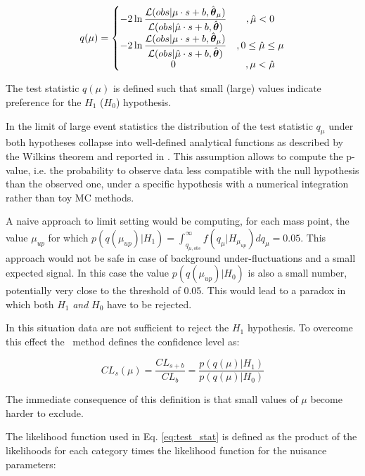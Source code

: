 \begin{equation}
q(\mu) = \left\{\begin{matrix}
-2 \operatorname{ln} \dfrac{\mathcal{L}(obs | \mu \cdot s + b, \hat{\boldsymbol\theta}_\mu)}{\mathcal{L}(obs | \hat{\mu} \cdot s + b, \hat{\boldsymbol\theta})} & , \hat{\mu} < 0\\ 
-2 \operatorname{ln} \dfrac{\mathcal{L}(obs | \mu \cdot s + b, \hat{\boldsymbol\theta}_\mu)}{\mathcal{L}(obs | \hat{\mu} \cdot s + b, \hat{\boldsymbol\theta})} & ,0 \leq \hat{\mu} \leq \mu \\ 
0 & , \mu < \hat{\mu}
\end{matrix}\right.
\label{eq:test_stat}
\end{equation}

The test statistic $q(\mu)$ is defined such that small (large) values indicate preference for the $H_1$ ($H_0$) hypothesis.

In the limit of large event statistics the distribution of the test statistic $q_\mu$ under both hypotheses collapse into well-defined analytical functions as described by the Wilkins theorem and reported in \cite{Cowan:2010js, higgscombo}. This assumption allows to compute the p-value, i.e. the probability to observe data less compatible with the null hypothesis than the observed one, under a specific hypothesis with a numerical integration rather than toy MC methods.

A naive approach to limit setting would be computing, for each mass point, the value $\mu_{up}$ for which $p(q(\mu_{up}) | H_1) = \int_{q_{\mu,obs}}^{\infty}f(q_\mu|H_{\mu_{up}})dq_\mu = 0.05$. This approach would not be safe in case of background under-fluctuations and a small expected signal. In this case the value $p(q(\mu_{up}) | H_0)$ is also a small number, potentially very close to the threshold of 0.05. This would lead to a paradox in which both $H_1$ \emph{and} $H_0$ have to be rejected.

In this situation data are not sufficient to reject the $H_1$ hypothesis. To overcome this effect the \CLs\ method defines the confidence level as:

\begin{equation}
CL_s(\mu) = \dfrac{CL_{s+b}}{CL_b} = \dfrac{p(q(\mu) | H_1)}{p(q(\mu) | H_0)}
\end{equation}

The immediate consequence of this definition is that small values of $\mu$ become harder to exclude.

The likelihood function used in Eq. \ref{eq:test_stat} is defined as the product of the likelihoods for each category times the likelihood function for the nuisance parameters:

